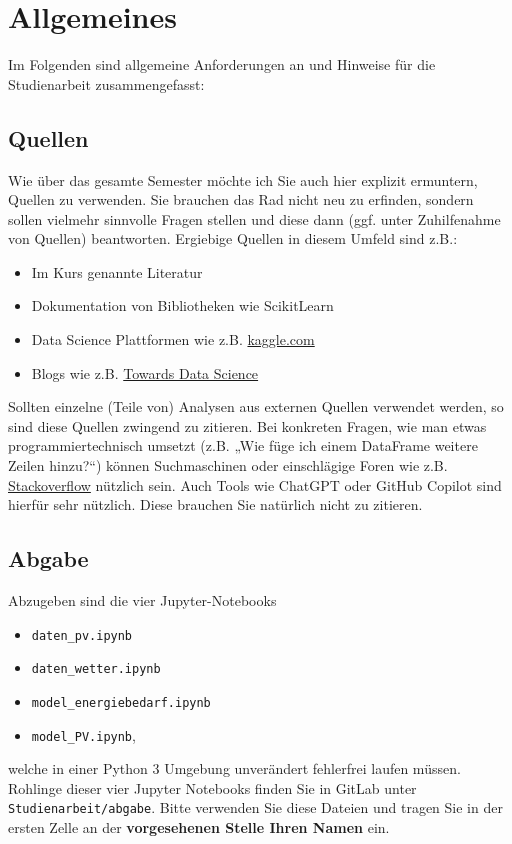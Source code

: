 \documentclass[11pt,a4paper]{article}
\begin{document}
\header[Studienarbeit]

\section*{Allgemeines}
Im Folgenden sind allgemeine Anforderungen an und Hinweise für die Studienarbeit zusammengefasst:

\subsection*{Quellen}
Wie über das gesamte Semester möchte ich Sie auch hier explizit ermuntern, Quellen zu verwenden. Sie brauchen das Rad nicht neu zu erfinden, sondern sollen vielmehr sinnvolle Fragen stellen und diese dann (ggf. unter Zuhilfenahme von Quellen) beantworten. Ergiebige Quellen in diesem Umfeld sind z.B.:
\begin{itemize}
	\item Im Kurs genannte Literatur
	\item Dokumentation von Bibliotheken wie ScikitLearn
	\item Data Science Plattformen wie z.B. \href{https://www.kaggle.com/}{kaggle.com}
	\item Blogs wie z.B. \href{https://towardsdatascience.com/}{Towards Data Science}
\end{itemize}
Sollten einzelne (Teile von) Analysen aus externen Quellen verwendet werden, so sind diese Quellen zwingend zu zitieren.
Bei konkreten Fragen, wie man etwas programmiertechnisch umsetzt (z.B. „Wie füge ich einem DataFrame weitere Zeilen hinzu?“) können Suchmaschinen oder einschlägige Foren wie z.B. \href{https://stackoverflow.com/}{Stack\-overflow} nützlich sein. Auch Tools wie ChatGPT oder GitHub Copilot sind hierfür sehr nützlich. Diese brauchen Sie natürlich nicht zu zitieren.


\subsection*{Abgabe}
Abzugeben sind die vier Jupyter-Notebooks
\begin{itemize}
    \item \texttt{daten\_pv.ipynb}
    \item \texttt{daten\_wetter.ipynb}
    \item \texttt{model\_energiebedarf.ipynb}
    \item \texttt{model\_PV.ipynb},
\end{itemize}
welche in einer Python 3 Umgebung unverändert fehlerfrei laufen müssen. Rohlinge dieser vier Jupyter Notebooks finden Sie in GitLab unter \texttt{Studienarbeit/abgabe}. Bitte verwenden Sie diese Dateien und tragen Sie in der ersten Zelle an der {\bf vorgesehenen Stelle Ihren Namen} ein.
\end{document}
